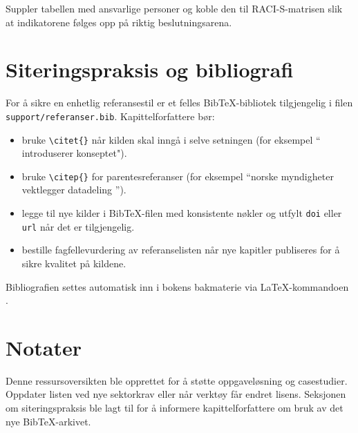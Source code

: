 Suppler tabellen med ansvarlige personer og koble den til RACI-S-matrisen slik at indikatorene følges opp på riktig beslutningsarena.

\section{Siteringspraksis og bibliografi}
For å sikre en enhetlig referansestil er et felles Bib\TeX-bibliotek tilgjengelig i filen \texttt{support/referanser.bib}. Kapittelforfattere bør:
\begin{itemize}
    \item bruke \verb+\citet{}+ når kilden skal inngå i selve setningen (for eksempel ``\citet{grieves2017digital} introduserer konseptet").
    \item bruke \verb+\citep{}+ for parentesreferanser (for eksempel ``norske myndigheter vektlegger datadeling \citep{regjeringen2022datastrategi}'').
    \item legge til nye kilder i Bib\TeX-filen med konsistente nøkler og utfylt \texttt{doi} eller \texttt{url} når det er tilgjengelig.
    \item bestille fagfellevurdering av referanselisten når nye kapitler publiseres for å sikre kvalitet på kildene.
\end{itemize}

Bibliografien settes automatisk inn i bokens bakmaterie via \LaTeX-kommandoen \verb++.

\section{Notater}
Denne ressursoversikten ble opprettet for å støtte oppgaveløsning og casestudier. Oppdater listen ved nye sektorkrav eller når verktøy får endret lisens. Seksjonen om siteringspraksis ble lagt til for å informere kapittelforfattere om bruk av det nye Bib\TeX-arkivet.

